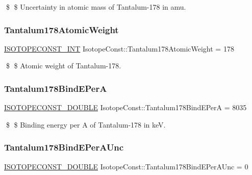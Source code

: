 \$ \$ Uncertainty in atomic mass of Tantalum-\/178 in amu. \mbox{\label{group___isotope_const-_tantalum-_ta178_ga5ef445ad1ccf3763b2f77dbef2d937dc}} 
\subsubsection{\texorpdfstring{Tantalum178\+Atomic\+Weight}{Tantalum178AtomicWeight}}
{\footnotesize\ttfamily \mbox{\hyperlink{group___isotope_const-_macros_ga5f18360b3e99483a35c32d789e62621c}{I\+S\+O\+T\+O\+P\+E\+C\+O\+N\+S\+T\+\_\+\+I\+NT}} Isotope\+Const\+::\+Tantalum178\+Atomic\+Weight = 178}

\$ \$ Atomic weight of Tantalum-\/178. \mbox{\label{group___isotope_const-_tantalum-_ta178_ga492472e3d39588d018c7ddb4604de3aa}} 
\subsubsection{\texorpdfstring{Tantalum178\+Bind\+E\+PerA}{Tantalum178BindEPerA}}
{\footnotesize\ttfamily \mbox{\hyperlink{group___isotope_const-_macros_ga8f45a7272ce02c0b4c65c44636ed719a}{I\+S\+O\+T\+O\+P\+E\+C\+O\+N\+S\+T\+\_\+\+D\+O\+U\+B\+LE}} Isotope\+Const\+::\+Tantalum178\+Bind\+E\+PerA = 8035}

\$ \$ Binding energy per A of Tantalum-\/178 in keV. \mbox{\label{group___isotope_const-_tantalum-_ta178_ga8a8ee1df8f7d9aa4a5302d11a99d7447}} 
\subsubsection{\texorpdfstring{Tantalum178\+Bind\+E\+Per\+A\+Unc}{Tantalum178BindEPerAUnc}}
{\footnotesize\ttfamily \mbox{\hyperlink{group___isotope_const-_macros_ga8f45a7272ce02c0b4c65c44636ed719a}{I\+S\+O\+T\+O\+P\+E\+C\+O\+N\+S\+T\+\_\+\+D\+O\+U\+B\+LE}} Isotope\+Const\+::\+Tantalum178\+Bind\+E\+Per\+A\+Unc = 0}

